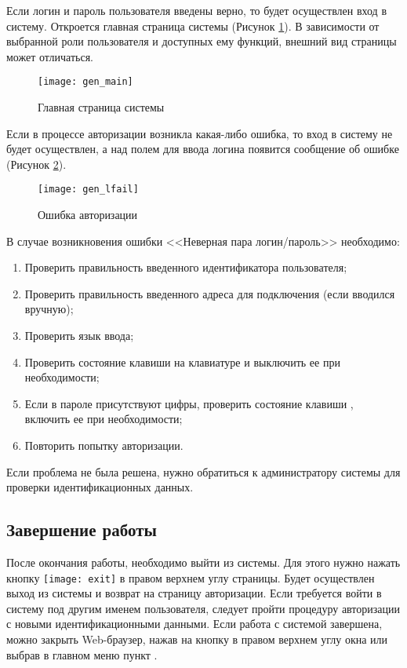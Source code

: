 Если логин и пароль пользователя введены верно, то будет осуществлен вход в систему. Откроется главная страница системы (Рисунок \ref{img_gen_main}). В зависимости от выбранной роли пользователя и доступных ему функций, внешний вид страницы может отличаться.  

\begin{figure}[!ht]\centering
 \texttt{[image: gen\_main]}
 \caption{Главная страница системы}
 \label{img_gen_main}
\end{figure} 

Если в процессе авторизации возникла какая-либо ошибка, то вход в систему не будет осуществлен, а над полем для ввода логина появится сообщение об ошибке (Рисунок \ref{img_gen_lfail}).

\begin{figure}[!ht]\centering
 \texttt{[image: gen\_lfail]}
 \caption{Ошибка авторизации}
 \label{img_gen_lfail}
\end{figure} 

В случае возникновения ошибки <<Неверная пара логин/пароль>> необходимо:
\begin{enumerate}
 \item Проверить правильность введенного идентификатора пользователя;
 \item Проверить правильность введенного адреса для подключения (если вводился вручную);
 \item Проверить язык ввода;
 \item Проверить состояние клавиши  на клавиатуре и выключить ее при необходимости;
 \item Если в пароле присутствуют цифры, проверить состояние клавиши , включить ее при необходимости;
 \item Повторить попытку авторизации.
\end{enumerate}
 
Если проблема не была решена, нужно обратиться к администратору системы для проверки идентификационных данных.



\subsection{Завершение работы}

После окончания работы, необходимо выйти из системы. Для этого нужно нажать кнопку \texttt{[image: exit]} в правом верхнем углу страницы. Будет осуществлен выход из системы и возврат на страницу авторизации. Если требуется войти в систему под другим именем пользователя, следует пройти процедуру авторизации с новыми идентификационными данными. Если работа с системой завершена, можно закрыть Web-браузер, нажав на кнопку  в правом верхнем углу окна или выбрав в главном меню пункт .

